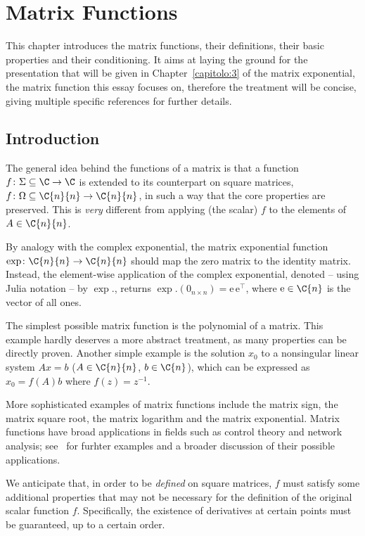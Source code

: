 \chapter{Matrix Functions}\label{capitolo:2}
This chapter introduces the matrix functions, their definitions, their basic properties and their conditioning. It aims at laying the ground for the presentation that will be given in Chapter~\ref{capitolo:3} of the matrix exponential, the matrix function this essay focuses on, therefore the treatment will be concise, giving multiple specific references for further details.

\section{Introduction}
The general idea behind the functions of a matrix is that a function $f\colon\Sigma\subseteq\C\to\C$ is extended to its counterpart on square matrices, $f\colon\Omega\subseteq\C{n}{n}\to\C{n}{n}$, in such a way that the core properties are preserved.
This is \emph{very} different from applying (the scalar) $f$ to the elements of $A\in\C{n}{n}$.

\begin{esempio*}
	By analogy with the complex exponential, the matrix exponential function $\exp\colon\C{n}{n}\to\C{n}{n}$ should map the zero matrix to the identity matrix.  
	Instead, the element-wise application of the complex exponential, denoted -- using Julia notation -- by $\exp\!.$, returns $\exp\!.(0_{n\times n})=\mathrm{e}\,\mathrm{e}^{\!\top}$, where $\mathrm{e}\in\C{n}$ is the vector of all ones.
\end{esempio*}

The simplest possible matrix function is the polynomial of a matrix. This example hardly deserves a more abstract treatment, as many properties can be directly proven. Another simple example is the solution $x_0$ to a nonsingular linear system $Ax=b$ ($A\in\C{n}{n}$, $b\in\C{n}$), which can be expressed as $x_0=f(A)b$ where $f(z)=z^{-1}$.

More sophisticated examples of matrix functions include the matrix sign, the matrix square root, the matrix logarithm and the matrix exponential. Matrix functions have broad applications in fields such as control theory and network analysis; see~\cite[§~2]{higham:matfun_book} for furhter examples and a broader discussion of their possible applications. 

We anticipate that, in order to be \emph{defined} on square matrices, $f$ must satisfy some additional properties that may not be necessary for the definition of the original scalar function $f$. Specifically, the existence of derivatives at certain points must be guaranteed, up to a certain order.

